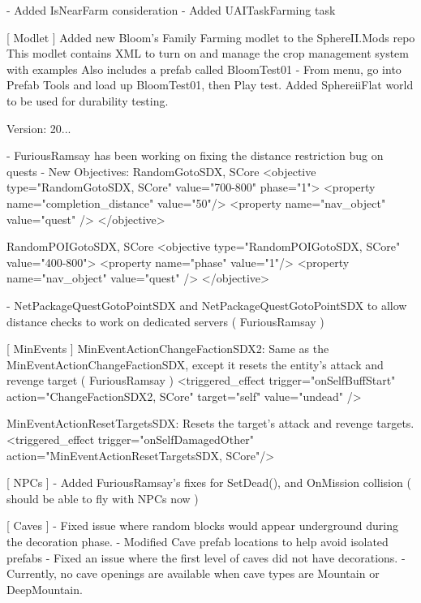 \begin{DoxyVerb}[ Utility AI]
    - Added IsNearFarm consideration 
    - Added UAITaskFarming task

[ Modlet ]
    Added new Bloom's Family Farming modlet to the SphereII.Mods repo
    This modlet contains XML to turn on and manage the crop management system with examples
    Also includes a prefab called BloomTest01
        - From menu, go into Prefab Tools and load up BloomTest01, then Play test.
    Added SphereiiFlat world to be used for durability testing.
\end{DoxyVerb}
 Version\+: 20... \begin{DoxyVerb}[ Quests ]
    - FuriousRamsay has been working on fixing the distance restriction bug on quests
    - New Objectives:   
        RandomGotoSDX, SCore
            <objective type="RandomGotoSDX, SCore" value="700-800" phase="1">
                <property name="completion_distance" value="50"/>
                <property name="nav_object" value="quest" />
            </objective>

        RandomPOIGotoSDX, SCore
            <objective type="RandomPOIGotoSDX, SCore" value="400-800">
                <property name="phase" value="1"/>
                <property name="nav_object" value="quest" />
            </objective>

    - NetPackageQuestGotoPointSDX and NetPackageQuestGotoPointSDX to allow distance checks to work on dedicated servers ( FuriousRamsay )

[ MinEvents ]
    MinEventActionChangeFactionSDX2: Same as the MinEventActionChangeFactionSDX, except it resets the entity's attack and revenge target ( FuriousRamsay )
        <triggered_effect trigger="onSelfBuffStart" action="ChangeFactionSDX2, SCore" target="self" value="undead" /> 

    MinEventActionResetTargetsSDX: Resets the target's attack and revenge targets.
         <triggered_effect trigger="onSelfDamagedOther" action="MinEventActionResetTargetsSDX, SCore"/>


[ NPCs ]
    - Added FuriousRamsay's fixes for SetDead(), and OnMission collision ( should be able to fly with NPCs now )

[ Caves ]
    - Fixed issue where random blocks would appear underground during the decoration phase.
    - Modified Cave prefab locations to help avoid isolated prefabs
    - Fixed an issue where the first level of caves did not have decorations.
    - Currently, no cave openings are available when cave types are Mountain or DeepMountain.


\end{DoxyVerb}
